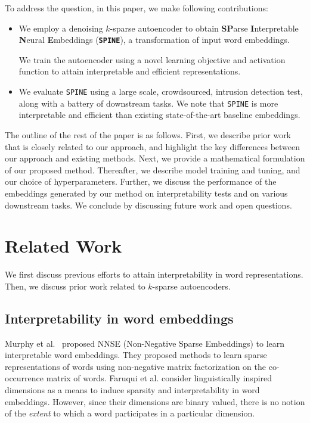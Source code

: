 \documentclass[letterpaper]{article} %
\begin{document}
To address the question, in this paper, we make following contributions:
\begin{itemize}
\item
 We employ a denoising $k$-sparse autoencoder to obtain \textbf{SP}arse \textbf{I}nterpretable \textbf{N}eural \textbf{E}mbeddings (\textbf{\texttt{SPINE}}), a transformation of input word embeddings.

We train the autoencoder using a novel learning objective and activation function to attain interpretable and efficient representations. 
\item 
We evaluate \texttt{SPINE} using a large scale, crowdsourced, intrusion detection test, along with a battery of downstream tasks. We note that \texttt{SPINE} is more interpretable and efficient than existing state-of-the-art baseline embeddings.
\end{itemize}

The outline of the rest of the paper is as follows. First, we describe prior work that is closely related to our approach, and highlight the key differences between our approach and existing methods. Next, we provide a mathematical formulation of our proposed method. Thereafter, we describe model training and tuning, and our choice of hyperparameters. Further, we discuss the performance of the embeddings generated by our method on interpretability tests and on various downstream tasks. We conclude by discussing future work and open questions.

\section{Related Work}
\label{sec:related}


We first discuss previous efforts to attain interpretability in word representations. Then, we discuss prior work related to $k$-sparse autoencoders.

\subsection*{Interpretability in word embeddings}

Murphy et al.~ proposed NNSE (Non-Negative Sparse Embeddings) to learn interpretable word embeddings. They proposed methods to learn sparse representations of words using non-negative matrix factorization on the co-occurrence matrix of words. Faruqui et al.  consider linguistically inspired dimensions as a means to induce sparsity and interpretability in word embeddings. However, since their dimensions are binary valued, there is no notion of the \emph{extent} to which a word participates in a particular dimension.
\end{document}
